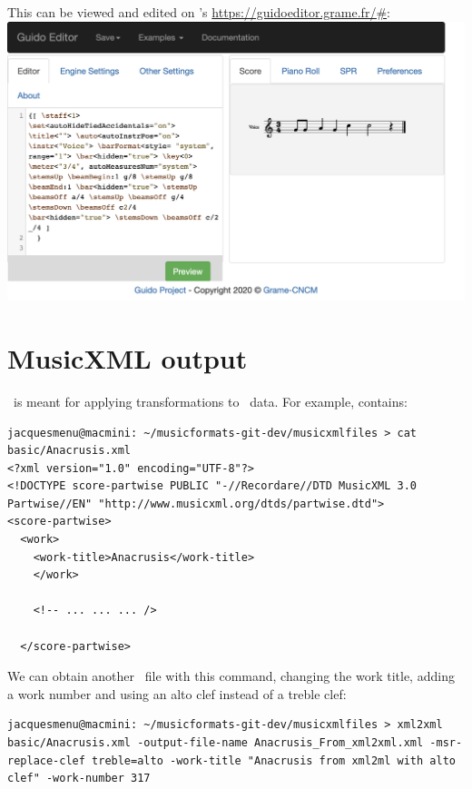 This can be viewed and edited on \fober 's \url{https://guidoeditor.grame.fr/#}:\\
\includegraphics[scale=0.7]{../graphics/Anacrusis_Guido.png}


\section{MusicXML output}

\xmlToXml\ is meant for applying transformations to \mxml\ data. For example,  contains:
\begin{lstlisting}[language=Terminal]
jacquesmenu@macmini: ~/musicformats-git-dev/musicxmlfiles > cat basic/Anacrusis.xml
<?xml version="1.0" encoding="UTF-8"?>
<!DOCTYPE score-partwise PUBLIC "-//Recordare//DTD MusicXML 3.0 Partwise//EN" "http://www.musicxml.org/dtds/partwise.dtd">
<score-partwise>
  <work>
    <work-title>Anacrusis</work-title>
    </work>

	<!-- ... ... ... />
	
  </score-partwise>
\end{lstlisting}

We can obtain another \mxml\ file with this command, changing the work title, adding a work number and using an alto clef instead of a treble clef:
\begin{lstlisting}[language=Terminal]
jacquesmenu@macmini: ~/musicformats-git-dev/musicxmlfiles > xml2xml basic/Anacrusis.xml -output-file-name Anacrusis_From_xml2xml.xml -msr-replace-clef treble=alto -work-title "Anacrusis from xml2ml with alto clef" -work-number 317
\end{lstlisting}

